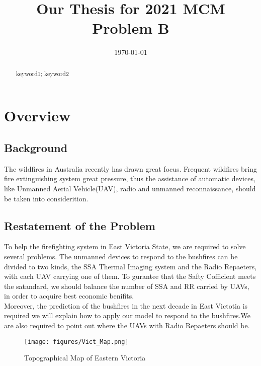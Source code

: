 \documentclass{mcmthesis}
\title{Our Thesis for 2021 MCM Problem B}
\date{\today}
\begin{document}
\begin{abstract}
 

\begin{keywords}
keyword1; keyword2
\end{keywords}
\end{abstract}
\maketitle
\tableofcontents
\newpage
\section{Overview}
\subsection{Background}


 The wildfires in Australia recently has drawn great focus. Frequent wildfires bring fire extinguishing system great pressure, thus the assistance
of automatic devices, like Unmanned Aerial Vehicle(UAV), 
radio and unmanned reconnaissance, should be taken into considerition. 
\subsection{Restatement of the Problem}

To help the firefighting system in East Victoria State, we are required
to solve several problems. The unmanned devices to respond to the bushfires can be divided to two kinds,
the SSA Thermal Imaging system and the Radio Repaeters, with each UAV carrying
one of them. To gurantee that the Safty Cofficient meets the satandard, we should
balance the number of SSA and RR carried by UAVs, in order to acquire best economic benifits.\\
Moreover, the prediction of the bushfires in the next decade in East Victotia is required
we will explain how to apply our model to respond to the bushfires.We are also required 
to point out where the UAVs with Radio Repaeters should be.

\begin{figure}[htbp]
  \centering
  \texttt{[image: figures/Vict\_Map.png]}
  \caption{Topographical Map of Eastern Victoria}
  \label{Topographical Map of Eastern Victoria}
\end{figure}
\end{document}
